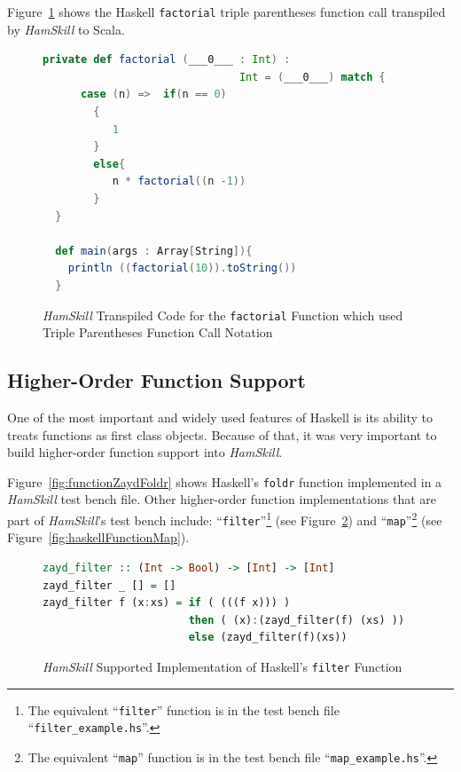 \documentclass{report}
\begin{document}
Figure~\ref{fig:scalaFunctionFactorial} shows the Haskell \texttt{factorial} triple parentheses function call transpiled by \textit{HamSkill} to Scala.

\begin{figure}[H]
\begin{mdframed}
\begin{lstlisting}[language=Scala]
  private def factorial (___0___ : Int) :
                               Int = (___0___) match {
      case (n) =>  if(n == 0)
        {
           1
        }
        else{
           n * factorial((n -1))
        }
  } 
  
  def main(args : Array[String]){
    println ((factorial(10)).toString())
  } 
\end{lstlisting}
\end{mdframed}
\caption{\textit{HamSkill} Transpiled Code for the \texttt{factorial} Function which used Triple Parentheses Function Call Notation}\label{fig:scalaFunctionFactorial}
\end{figure}

\subsection{Higher-Order Function Support}\label{sec:higherOrderFunctions}

One of the most important and widely used features of Haskell is its ability to treats functions as first class objects.  Because of that, it was very important to build higher-order function support into \textit{HamSkill}.

Figure~\ref{fig:functionZaydFoldr} shows Haskell's \texttt{foldr} function implemented in a \textit{HamSkill} test bench file.  Other higher-order function implementations that are part of \textit{HamSkill}'s test bench include: ``\texttt{filter}''\footnote{The equivalent ``\texttt{filter}'' function is in the test bench file ``\texttt{filter\_example.hs}''.} (see Figure~\ref{fig:haskellFunctionFilter}) and ``\texttt{map}''\footnote{The equivalent ``\texttt{map}'' function is in the test bench file ``\texttt{map\_example.hs}''.} (see Figure~\ref{fig:haskellFunctionMap}).

\begin{figure}[H]
\begin{mdframed}
\begin{lstlisting}[language=Haskell, basicstyle=\small]
zayd_filter :: (Int -> Bool) -> [Int] -> [Int]
zayd_filter _ [] = []
zayd_filter f (x:xs) = if ( (((f x))) )
                       then ( (x):(zayd_filter(f) (xs) ))
                       else (zayd_filter(f)(xs))
\end{lstlisting}
\end{mdframed}
\caption{\textit{HamSkill} Supported Implementation of Haskell's \texttt{filter} Function}\label{fig:haskellFunctionFilter}
\end{figure}
\end{document}
